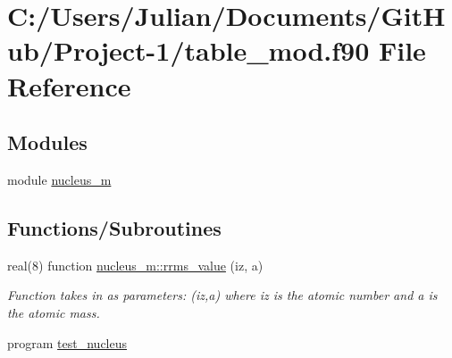 \hypertarget{table__mod_8f90}{}\section{C\+:/\+Users/\+Julian/\+Documents/\+Git\+Hub/\+Project-\/1/table\+\_\+mod.f90 File Reference}
\label{table__mod_8f90}
\subsection*{Modules}
\begin{DoxyCompactItemize}
\item 
module \mbox{\hyperlink{namespacenucleus__m}{nucleus\+\_\+m}}
\end{DoxyCompactItemize}
\subsection*{Functions/\+Subroutines}
\begin{DoxyCompactItemize}
\item 
real(8) function \mbox{\hyperlink{namespacenucleus__m_aa70383e98e9176269442449160eaaea0}{nucleus\+\_\+m\+::rrms\+\_\+value}} (iz, a)
\begin{DoxyCompactList}\small\item\em Function takes in as parameters\+: (iz,a) where \textquotesingle{}iz\textquotesingle{} is the atomic number and \textquotesingle{}a\textquotesingle{} is the atomic mass. \end{DoxyCompactList}\item 
program \mbox{\hyperlink{table__mod_8f90_a8ebb53a70bcfe3c94dbfbae3e3f52cba}{test\+\_\+nucleus}}
\end{DoxyCompactItemize}
